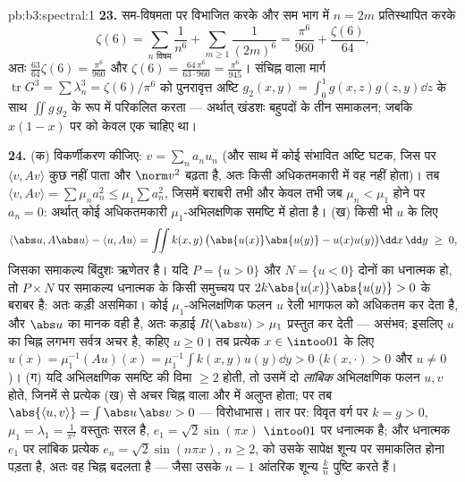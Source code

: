 \begin{solution}{pb:b3:spectral:1}
\textbf{23.} सम-विषमता पर विभाजित करके और सम भाग में $n = 2m$ प्रतिस्थापित
करके
\[
\zeta(6) = \sum_{n\text{ विषम}}\frac1{n^6} +
\sum_{m\geq1}\frac1{(2m)^6}
= \frac{\pi^6}{960} + \frac{\zeta(6)}{64},
\]
अतः $\frac{63}{64}\zeta(6) = \frac{\pi^6}{960}$ और $\zeta(6)
= \frac{64\,\pi^6}{63\cdot960} = \frac{\pi^6}{945}$। संचिह्न वाला मार्ग $\operatorname{tr}G^3 =
\sum\lambda_n^3 = \zeta(6)/\pi^6$ को पुनरावृत्त अष्टि
$g_2(x,y) = \int_0^1g(x,z)g(z,y)\dd z$ के साथ $\iint g\,g_2$ के रूप में परिकलित करता --- अर्थात् खंडशः बहुपदों
के तीन समाकलन; जबकि $x(1-x)$ पर  को केवल एक चाहिए था।

\textbf{24.} (क) विकर्णीकरण कीजिए: $v = \sum_na_nu_n$ (और साथ में कोई संभावित
अष्टि घटक, जिस पर $\langle v, Av\rangle$ कुछ नहीं पाता और $\norm v^2$ बढ़ता है, अतः किसी
अधिकतमकारी में वह नहीं होता)। तब $\langle v, Av\rangle = \sum\mu_na_n^2 \leq
\mu_1\sum a_n^2$, जिसमें बराबरी तभी और केवल
तभी जब $\mu_n < \mu_1$ होने पर $a_n = 0$: अर्थात् कोई अधिकतमकारी $\mu_1$-अभिलक्षणिक
समष्टि में होता है। (ख) किसी भी $u$ के लिए
\[
\langle\abs u, A\abs u\rangle - \langle u, Au\rangle
= \iint k(x,y)\,\bigl(\abs{u(x)}\abs{u(y)} -
u(x)u(y)\bigr)\dd x\,\dd y \;\geq\; 0,
\]
जिसका समाकल्य बिंदुशः ऋणेतर है। यदि $P = \{u >
0\}$ और $N = \{u < 0\}$ दोनों का 
धनात्मक हो, तो $P\times N$ पर समाकल्य धनात्मक  के किसी समुच्चय पर $2k\abs{u(x)}\abs{u(y)} >
0$
के बराबर है: अतः कड़ी असमिका। कोई $\mu_1$-अभिलक्षणिक फलन $u$ रेली
भागफल को अधिकतम कर देता है, और $\abs u$ का मानक वही है, अतः कड़ाई $R(\abs u) > \mu_1$
प्रस्तुत कर देती --- असंभव; इसलिए $u$ का चिह्न लगभग सर्वत्र अचर
है, कहिए $u \geq 0$। तब प्रत्येक $x \in
\intoo01$ के लिए $u(x) = \mu_1^{-1}(Au)(x) =
\mu_1^{-1}\int k(x,y)u(y)\dd y > 0$ ($k(x,\cdot) > 0$ और $u \neq 0$)।
(ग) यदि अभिलक्षणिक समष्टि की विमा $\geq 2$ होती, तो उसमें दो \emph{लांबिक}
अभिलक्षणिक फलन $u, v$ होते, जिनमें से प्रत्येक (ख) से अचर चिह्न वाला
और  में अलुप्त होता; पर तब $\abs{\langle u, v\rangle} = \int\abs u\,\abs v > 0$ --- विरोधाभास। तार पर: विवृत
वर्ग पर $k = g > 0$, $\mu_1 = \lambda_1 = \frac1{\pi^2}$ वस्तुतः सरल है, $e_1 = \sqrt2\sin(\pi x)$ $\intoo01$ पर धनात्मक है; और
धनात्मक $e_1$ पर लांबिक प्रत्येक $e_n = \sqrt2\sin(n\pi x)$, $n \geq 2$, को उसके सापेक्ष शून्य
पर समाकलित होना पड़ता है, अतः वह चिह्न बदलता है --- जैसा उसके $n - 1$
आंतरिक शून्य $\frac kn$ पुष्टि करते हैं।


\end{solution}
